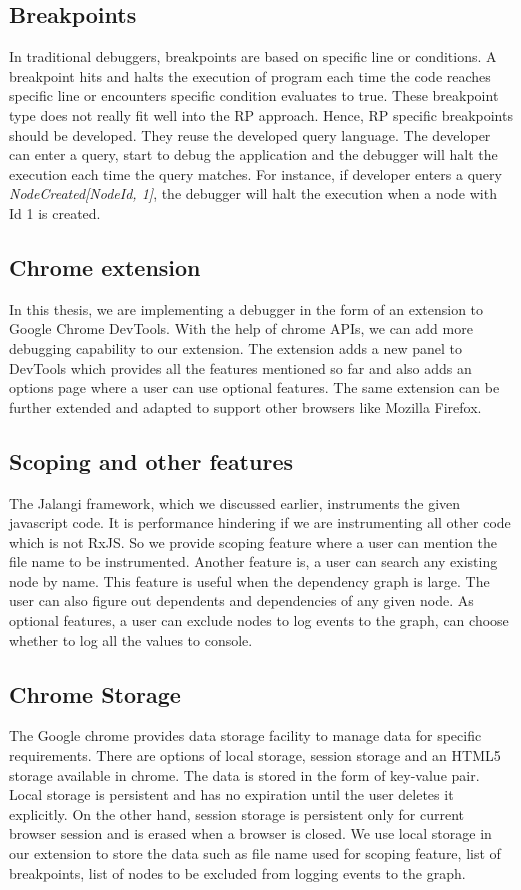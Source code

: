 \subsection{Breakpoints}
In traditional debuggers, breakpoints are based on specific line or conditions. A breakpoint hits and halts the execution of program each time the code reaches specific line or encounters specific condition evaluates to true. These breakpoint type does not really fit well into the RP approach. Hence, RP specific breakpoints should be developed. They reuse the developed query language. The developer can enter a query, start to debug the application and the debugger will halt the execution each time the query matches. For instance, if developer enters a query \textit{NodeCreated[NodeId, 1]}, the debugger will halt the execution when a node with Id 1 is created. 

\subsection{Chrome extension}
In this thesis, we are implementing a debugger in the form of an extension to Google Chrome DevTools. With the help of chrome APIs, we can add more debugging capability to our extension. The extension adds a new panel to DevTools which provides all the features mentioned so far and also adds an options page where a user can use optional features. The same extension can be further extended and adapted to support other browsers like Mozilla Firefox\cite{firefox}.

\subsection{Scoping and other features}
The Jalangi framework, which we discussed earlier, instruments the given javascript code. It is performance hindering if we are instrumenting all other code which is not RxJS. So we provide scoping feature where a user can mention the file name to be instrumented. 
Another feature is, a user can search any existing node by name. This feature is useful when the dependency graph is large. The user can also figure out dependents and dependencies of any given node. As optional features, a user can exclude nodes to log events to the graph, can choose whether to log all the values to console. 

\subsection{Chrome Storage}
The Google chrome provides data storage facility to manage data for specific requirements\cite{chrome-storage}. There are options of local storage, session storage and an HTML5 storage available in chrome. The data is stored in the form of key-value pair. Local storage is persistent and has no expiration until the user deletes it explicitly. On the other hand, session storage is persistent only for current browser session and is erased when a browser is closed. We use local storage in our extension to store the data such as file name used for scoping feature, list of breakpoints, list of nodes to be excluded from logging events to the graph.

